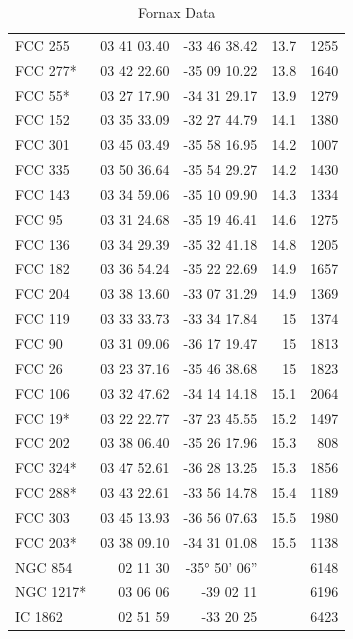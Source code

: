 \documentclass[12pt]{article}
\begin{document}
\begin{table}[!htp]
\begin{minipage}[t]{.45\linewidth}
\begin{tabular}{lrrrr}
FCC 255 &03 41 03.40 &-33 46 38.42 &13.7 &1255 \\
FCC 277* &03 42 22.60 &-35 09 10.22 &13.8 &1640 \\
FCC 55* &03 27 17.90 &-34 31 29.17 &13.9 &1279 \\
FCC 152 &03 35 33.09 &-32 27 44.79 &14.1 &1380 \\
FCC 301 &03 45 03.49 &-35 58 16.95 &14.2 &1007 \\
FCC 335 &03 50 36.64 &-35 54 29.27 &14.2 &1430 \\
FCC 143 &03 34 59.06 &-35 10 09.90 &14.3 &1334 \\
FCC 95 &03 31 24.68 &-35 19 46.41 &14.6 &1275 \\
FCC 136 &03 34 29.39 &-35 32 41.18 &14.8 &1205 \\
FCC 182 &03 36 54.24 &-35 22 22.69 &14.9 &1657 \\
FCC 204 &03 38 13.60 &-33 07 31.29 &14.9 &1369 \\
FCC 119 &03 33 33.73 &-33 34 17.84 &15 &1374 \\
FCC 90 &03 31 09.06 &-36 17 19.47 &15 &1813 \\
FCC 26 &03 23 37.16 &-35 46 38.68 &15 &1823 \\
FCC 106 &03 32 47.62 &-34 14 14.18 &15.1 &2064 \\
FCC 19* &03 22 22.77 &-37 23 45.55 &15.2 &1497 \\
FCC 202 &03 38 06.40 &-35 26 17.96 &15.3 &808 \\
FCC 324* &03 47 52.61 &-36 28 13.25 &15.3 &1856 \\
FCC 288* &03 43 22.61 &-33 56 14.78 &15.4 &1189 \\
FCC 303 &03 45 13.93 &-36 56 07.63 &15.5 &1980 \\
FCC 203* &03 38 09.10 &-34 31 01.08 &15.5 &1138 \\
NGC 854 &02 11 30 &-35° 50’ 06” & &6148 \\
NGC 1217* &03 06 06 &-39 02 11 & & 6196 \\
IC 1862 &02 51 59 &-33 20 25 & &6423 \\
      \bottomrule
        \end{tabular}
        \caption*{Fornax Data}
    \end{minipage}
\end{table}
\end{document}
